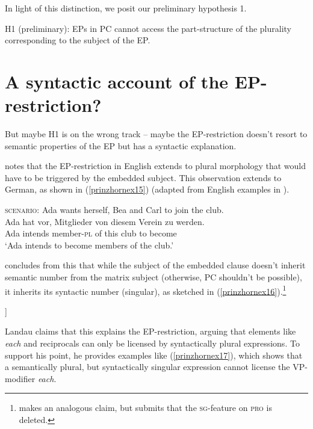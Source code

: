\documentclass[output=paper]{langscibook}
\begin{document}
In light of this distinction, we posit our preliminary hypothesis 1.


\ea H1 (preliminary): EPs in PC cannot access the part-structure of the plurality corresponding to the subject of the EP.\label{prinzhornex14}
\z 




\section{A syntactic account of the EP-restriction?}\label{prinzhornsec:3}

But maybe H1 is on the wrong track -- maybe the EP-restriction doesn't resort to semantic properties of the EP but has a syntactic explanation. 

\citet{Landau:2000} notes that the EP-restriction in English extends to plural morphology that would have to be triggered by  the embedded subject. This observation extends to German, as shown in (\ref{prinzhornex15}) (adapted from English examples in \citealt{Landau:2000}).


\ea \label{prinzhornex15}
\textsc{scenario:} Ada wants herself, Bea and Carl to join the club.\\
\gll {*} {Ada} {hat vor}, {Mitglieder} {von} {diesem} {Verein} {zu} {werden}.\\
   {} Ada intends  member-\textsc{pl} of this club to become\\
   \glt\phantom{*} `Ada intends to become members of the club.'
\z



\citet{Landau:2000} concludes from this that while the subject of the embedded clause doesn't inherit semantic number from the matrix subject (otherwise, PC shouldn't be possible), it inherits its syntactic number (singular), as sketched in (\ref{prinzhornex16}).\footnote{\citet{Pearson:2016} makes an analogous claim, but submits that the \textsc{sg}-feature on \textsc{pro} is deleted.}

\ea\relax [Ada$_{sg}$ plant [\textsc{pro}$_{sg}$ Mitglieder von diesem Verein zu werden]]\label{prinzhornex16}
\z

Landau claims that this explains the EP-restriction, arguing that elements like \textit{each} and reciprocals can only be licensed by syntactically plural expressions. To support his point, he provides  examples like (\ref{prinzhornex17}), which shows that a semantically plural, but syntactically singular expression cannot license the VP-modifier \textit{each}.
\end{document}
